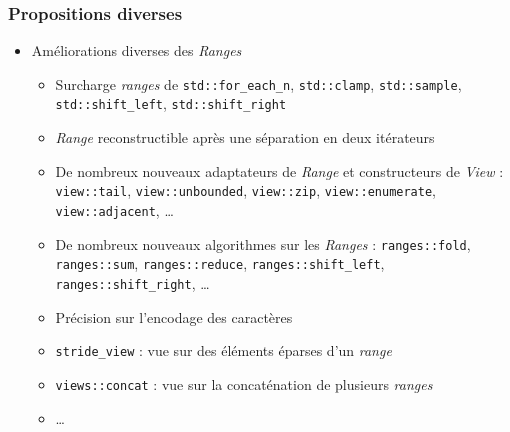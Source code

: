 \documentclass[C++.tex]{subfiles}
\begin{document}
\begin{frame}[fragile]
	\frametitle{Propositions diverses}
	\begin{itemize}
		\item Améliorations diverses des \textit{Ranges}
		\begin{itemize}
			\item Surcharge \textit{ranges} de \lstinline|std::for_each_n|, \lstinline|std::clamp|, \lstinline|std::sample|, \lstinline|std::shift_left|, \lstinline|std::shift_right|
			\item \textit{Range} reconstructible après une séparation en deux itérateurs
			\item De nombreux nouveaux adaptateurs de \textit{Range} et constructeurs de \textit{View} : \lstinline|view::tail|, \lstinline|view::unbounded|, \lstinline|view::zip|, \lstinline|view::enumerate|, \lstinline|view::adjacent|, \ldots
			\item De nombreux nouveaux algorithmes sur les \textit{Ranges} : \lstinline|ranges::fold|, \lstinline|ranges::sum|, \lstinline|ranges::reduce|, \lstinline|ranges::shift_left|, \lstinline|ranges::shift_right|, \ldots
			\item Précision sur l'encodage des caractères 
			\item \lstinline|stride_view| : vue sur des éléments éparses d'un \textit{range}
			\item \lstinline|views::concat| : vue sur la concaténation de plusieurs \textit{ranges}
			\item \ldots
		\end{itemize}
	\end{itemize}
\end{frame}
\end{document}
